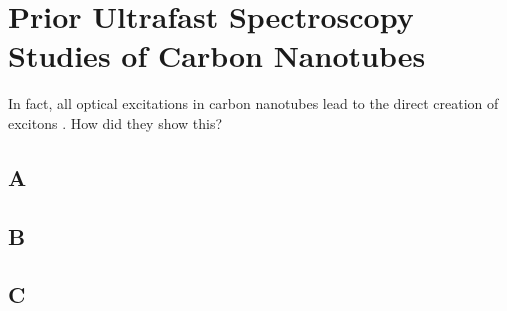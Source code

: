 \chapter{Prior Ultrafast Spectroscopy Studies of Carbon Nanotubes}

In fact, all optical excitations in carbon nanotubes lead to the direct creation of excitons \cite{wang2005optical}. How did they show this?

\section{A}

\section{B}

\section{C}